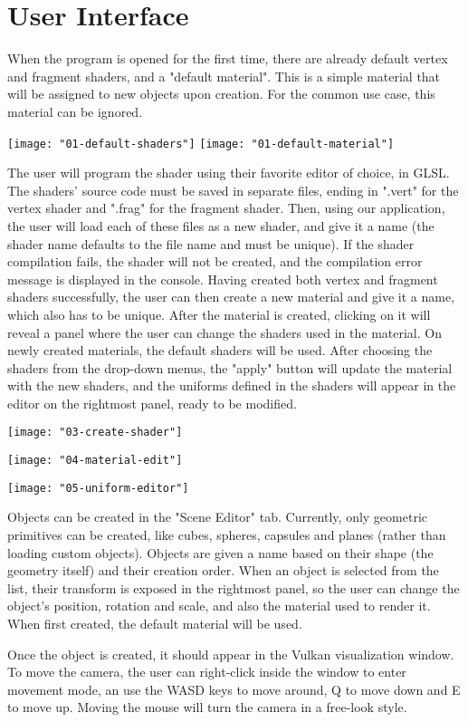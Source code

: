 \section{User Interface}
When the program is opened for the first time, there are already default vertex and fragment shaders, and a "default material". This is a simple material that will be assigned to new objects upon creation. For the common use case, this material can be ignored.

\texttt{[image: "01-default-shaders"]}
\texttt{[image: "01-default-material"]}

The user will program the shader using their favorite editor of choice, in GLSL. The shaders' source code must be saved in separate files, ending in ".vert" for the vertex shader and ".frag" for the fragment shader. Then, using our application, the user will load each of these files as a new shader, and give it a name (the shader name defaults to the file name and must be unique). If the shader compilation fails, the shader will not be created, and the compilation error message is displayed in the console. Having created both vertex and fragment shaders successfully, the user can then create a new material and give it a name, which also has to be unique. After the material is created, clicking on it will reveal a panel where the user can change the shaders used in the material. On newly created materials, the default shaders will be used. After choosing the shaders from the drop-down menus, the "apply" button will update the material with the new shaders, and the uniforms defined in the shaders will appear in the editor on the rightmost panel, ready to be modified.

\texttt{[image: "03-create-shader"]}

\texttt{[image: "04-material-edit"]}

\texttt{[image: "05-uniform-editor"]}

Objects can be created in the "Scene Editor" tab. Currently, only geometric primitives can be created, like cubes, spheres, capsules and planes (rather than loading custom objects). Objects are given a name based on their shape (the geometry itself) and their creation order. When an object is selected from the list, their transform is exposed in the rightmost panel, so the user can change the object's position, rotation and scale, and also the material used to render it. When first created, the default material will be used.


Once the object is created, it should appear in the Vulkan visualization window. To move the camera, the user can right-click inside the window to enter movement mode, an use the WASD keys to move around, Q to move down and E to move up. Moving the mouse will turn the camera in a free-look style.
